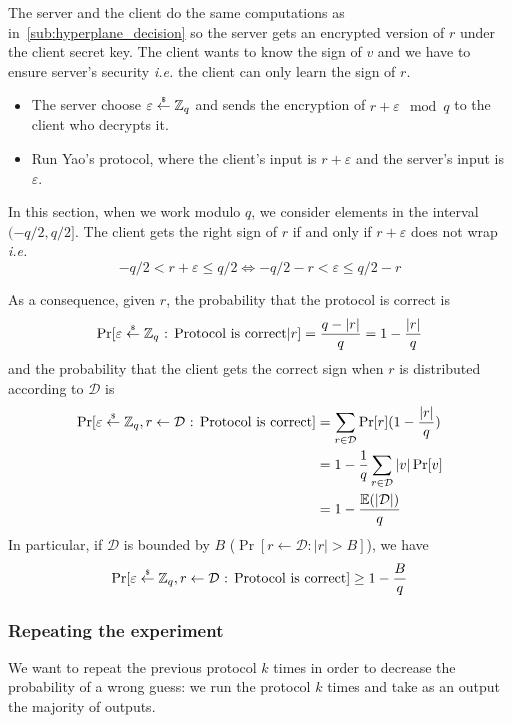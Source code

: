 \documentclass[11pt]{article}
\begin{document}
The server and the client do the same computations as in~\ref{sub:hyperplane_decision} so the server gets an encrypted version of $r$ under the client secret key. The client wants to know the sign of $v$ and we have to ensure server's security \emph{i.e.} the client can only learn the sign of $r$.

\begin{itemize}
	\item The server choose $\varepsilon \stackrel{\scriptscriptstyle{\$}}{\gets} {\mathbb Z}_q$ and sends the encryption of $r + \varepsilon \mod q$ to the client who decrypts it.
	\item Run Yao's protocol, where the client's input is $r + \varepsilon$ and the server's input is $\varepsilon$.
\end{itemize} 

In this section, when we work modulo $q$, we consider elements in the interval $(-q/2, q/2]$. The client gets the right sign of $r$ if and only if $r + \varepsilon$ does not wrap \emph{i.e.}
\[
	-q/2 < r + \varepsilon \leq q/2 \Leftrightarrow  -q/2 - r< \varepsilon \leq q/2 - r
\]

As a consequence, given $r$, the probability that the protocol is correct is 
\[ 
	\Pr[\varepsilon \stackrel{\scriptscriptstyle{\$}}{\gets} {\mathbb Z}_q\text{ : Protocol is correct} | r] = \frac{q - |r|}{q} = 1 - \frac{|r|}{q}
\]
and the probability that the client gets the correct sign when $r$ is distributed according to $\mathcal{D}$ is 
\begin{align*}
	\Pr[\varepsilon \stackrel{\scriptscriptstyle{\$}}{\gets} {\mathbb Z}_q, r \gets \mathcal{D}\text{ : Protocol is correct}] 
		&= \sum_{r \in \mathcal{D}} \Pr[r] (1 - \frac{|r|}{q}) \\
		&= 1 - \frac{1}{q}\sum_{r \in \mathcal{D}} |v| \Pr[v]  \\
		&= 1 - \frac{\mathbb{E}(|\mathcal{D}|)}{q}
\end{align*}
In particular, if $\mathcal{D}$ is bounded by $B$ ($\Pr[ r \gets \mathcal{D} : |r| > B]$), we have
\[
\Pr[\varepsilon \stackrel{\scriptscriptstyle{\$}}{\gets} {\mathbb Z}_q, r \gets \mathcal{D}\text{ : Protocol is correct}] \geq 1 - \frac{B}{q}
\] 
    
\subsubsection{Repeating the experiment}

We want to repeat the previous protocol $k$ times in order to decrease the probability of a wrong guess: we run the protocol $k$ times and take as an output the majority of outputs. 
\end{document}
